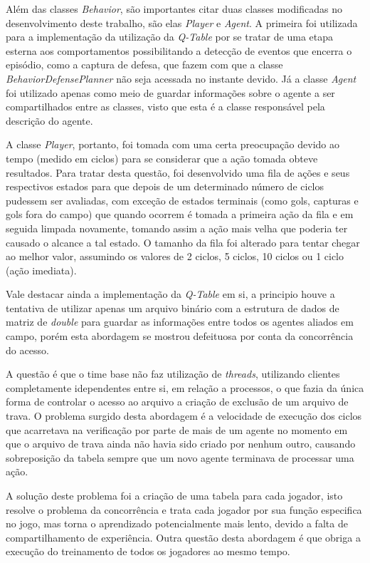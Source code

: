 Além das classes \textit{Behavior}, são importantes citar duas classes
modificadas no desenvolvimento deste trabalho, são elas \textit{Player} e
\textit{Agent}. A primeira foi utilizada para a implementação da utilização da
\textit{Q-Table} por se tratar de uma etapa esterna aos comportamentos
possibilitando a detecção de eventos que encerra o episódio, como a captura de
defesa, que fazem com que a classe \textit{BehaviorDefensePlanner} não seja
acessada no instante devido. Já a classe \textit{Agent} foi utilizado apenas
como meio de guardar informações sobre o agente a ser compartilhados entre as
classes, visto que esta é a classe responsável pela descrição do agente.

A classe \textit{Player}, portanto, foi tomada com uma certa preocupação devido
ao tempo (medido em ciclos) para se considerar que a ação tomada obteve
resultados. Para tratar desta questão, foi desenvolvido uma fila de ações e seus
respectivos estados para que depois de um determinado número de ciclos pudessem
ser avaliadas, com exceção de estados terminais (como gols, capturas e gols fora
do campo) que quando ocorrem é tomada a primeira ação da fila e em seguida
limpada novamente, tomando assim a ação mais velha que poderia ter causado o
alcance a tal estado. O tamanho da fila foi alterado para tentar chegar ao
melhor valor, assumindo os valores de 2 ciclos, 5 ciclos, 10 ciclos ou 1 ciclo
(ação imediata).

Vale destacar ainda a implementação da \textit{Q-Table} em si, a principio houve
a tentativa de utilizar apenas um arquivo binário com a estrutura de dados de
matriz de \textit{double} para guardar as informações entre todos os agentes
aliados  em campo, porém esta abordagem se mostrou defeituosa por conta da
concorrência do acesso.

A questão é que o time base não faz utilização de \textit{threads}, utilizando
clientes completamente idependentes entre si, em relação a processos, o que
fazia da única forma de controlar o acesso ao arquivo a criação de exclusão de
um arquivo de trava. O problema surgido desta abordagem é a velocidade de
execução dos ciclos que acarretava na verificação por parte de mais de um agente
no momento em que o arquivo de trava ainda não havia sido criado por nenhum
outro, causando sobreposição da tabela sempre que um novo agente terminava de
processar uma ação.

A solução deste problema foi a criação de uma tabela para cada jogador, isto
resolve  o problema da concorrência e trata cada jogador por sua função
especifica no jogo, mas torna o aprendizado potencialmente mais
lento, devido a falta de compartilhamento de experiência. Outra questão desta
abordagem é que obriga a execução do treinamento de todos os jogadores ao mesmo tempo.

